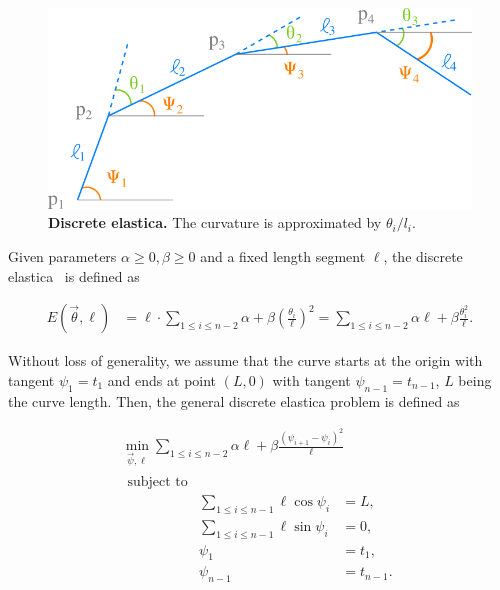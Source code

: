 \begin{figure}
\center
\includegraphics[scale=0.6]{figures/chapter4/bruckstein/polygonal-line.png}
\caption{\textbf{Discrete elastica.} The curvature is approximated by $\theta_i/l_i$.}
\label{ch4:fig:bruckstein-polygonal-line}
\end{figure}

Given parameters $\alpha \geq 0,\beta \geq 0$ and a fixed length segment $\ell$, the discrete elastica~\cite{bruckstein01discrete} is defined as

\begin{align}
	E(\vec{\theta},\ell) &= \ell \cdot \sum_{1 \leq i \leq n-2}{ \alpha + \beta \left(\frac{\theta_i}{\ell}\right)^2} = \sum_{1 \leq i \leq n-2}{ \alpha \ell + \beta \frac{\theta_i^2}{\ell}}.
	\label{ch4:eq:discrete-elastica}
\end{align}

Without loss of generality, we assume that the curve starts at the origin with tangent $\psi_1=t_1$ and ends at point $(L,0)$ with tangent $\psi_{n-1}=t_{n-1}$, $L$ being the curve length. Then, the general discrete elastica problem is defined as

\begin{align*}
	\min_{\vec{\psi},\ell}{ \sum_{1 \leq i \leq n-2 }{ \alpha \ell + \beta \frac{ (\psi_{i+1} - \psi_{i} )^2}{\ell}}}\\
	\begin{array}{rrl}
		\text{subject to}&& \\
		&\displaystyle \sum_{1 \leq i \leq n-1}{\ell\cos \psi_i} &= L, \\[1em]
		&\displaystyle \sum_{1 \leq i \leq n-1}{\ell\sin \psi_i} &= 0, \\[1em]
		&\displaystyle \psi_1 &= t_1, \\[1em]
		&\displaystyle \psi_{n-1} &= t_{n-1}.
	\end{array}
\end{align*}

